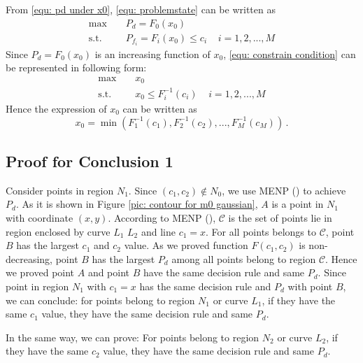 \documentclass[12pt,journal,a4paper,twoside,onecolumn]{IEEEtran}
\newcommand{\rmnum}[1]{\romannumeral #1}
\begin{document}
\begin{spacing}{2.5}
From \eqref{equ: pd under x0}, \eqref{equ: problemstate} can be written as 
\begin{equation}
\begin{split}
\label{equ: constrain condition}
\max\;\;\;\; &P_d = F_0(x_0)\\
\text{s.t.}\;\;\;\;&P_{f_i} =  F_i(x_0) \leq c_i\;\;\;\;i = 1, 2, ..., M
\end{split}
\end{equation}
Since $P_d = F_0(x_0)$ is an increasing function of $x_0$, \eqref{equ: constrain condition} can be represented in following form:
\begin{equation}
\begin{split}
\label{equ: final constrain}
\max\;\;\;\; &x_0\\
\text{s.t.}\;\;\;\;&x_0 \leq F_i^{-1}(c_i)\;\;\;\;i = 1, 2, ..., M
\end{split}
\end{equation}
Hence the expression of $x_0$ can be written as
\begin{equation}
x_0 = \min(F_1^{-1}(c_1), F_2^{-1}(c_2), ..., F_M^{-1}(c_M))\,.
\end{equation}

\subsection{Proof for Conclusion 1}

Consider points in region $N_1$. Since $(c_1, c_2) \notin N_0$, we use MENP (\rmnum{2}) to achieve $P_d$. As it is shown in Figure \ref{pic: contour for m0 gaussian}, $A$ is a point in $N_1$ with coordinate $(x, y)$. According to MENP (\rmnum{2}), $\mathcal{C}$ is the set of points lie in region enclosed by curve $L_1$ $L_2$ and line $c_1 = x$. For all points belongs to $\mathcal{C}$, point $B$ has the largest $c_1$ and $c_2$ value. As we proved function $F(c_1, c_2)$ is non-decreasing, point $B$ has the largest $P_d$ among all points belong to region $\mathcal{C}$. Hence we proved point $A$ and point $B$ have the same decision rule and same $P_d$. Since point in region $N_1$ with $c_1 = x$ has the same decision rule and $P_d$ with point $B$, we can conclude: for points belong to region $N_1$ or curve $L_1$, if they have the same $c_1$ value, they have the same decision rule and same $P_d$.

In the same way, we can prove: For points belong to region $N_2$ or curve $L_2$, if they have the same $c_2$ value, they have the same decision rule and same $P_d$.


\end{spacing}
\end{document}
